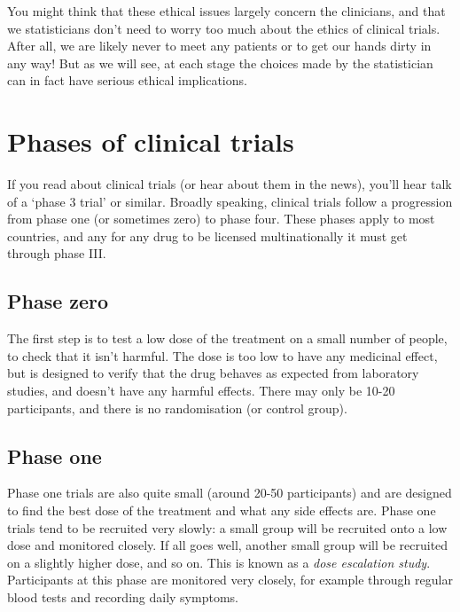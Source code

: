 \documentclass[
  openany]{book}
\theoremstyle{definition}
\theoremstyle{definition}
\theoremstyle{definition}
\theoremstyle{definition}
\theoremstyle{remark}
\begin{document}
You might think that these ethical issues largely concern the clinicians, and that we statisticians don't need to worry too much about the ethics of clinical trials. After all, we are likely never to meet any patients or to get our hands dirty in any way! But as we will see, at each stage the choices made by the statistician can in fact have serious ethical implications.

\section{Phases of clinical trials}\label{phases-of-clinical-trials}

If you read about clinical trials (or hear about them in the news), you'll hear talk of a `phase 3 trial' or similar. Broadly speaking, clinical trials follow a progression from phase one (or sometimes zero) to phase four. These phases apply to most countries, and any for any drug to be licensed multinationally it must get through phase III.

\subsection*{Phase zero}\label{phase-zero}

The first step is to test a low dose of the treatment on a small number of people, to check that it isn't harmful. The dose is too low to have any medicinal effect, but is designed to verify that the drug behaves as expected from laboratory studies, and doesn't have any harmful effects. There may only be 10-20 participants, and there is no randomisation (or control group).

\subsection*{Phase one}\label{phase-one}

Phase one trials are also quite small (around 20-50 participants) and are designed to find the best dose of the treatment and what any side effects are. Phase one trials tend to be recruited very slowly: a small group will be recruited onto a low dose and monitored closely. If all goes well, another small group will be recruited on a slightly higher dose, and so on. This is known as a \emph{dose escalation study}. Participants at this phase are monitored very closely, for example through regular blood tests and recording daily symptoms.
\end{document}
